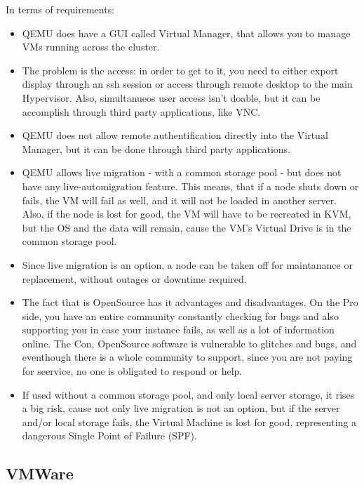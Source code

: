 In terms of requirements:

\begin{itemize}
  \item QEMU does have a GUI called Virtual Manager, that allows you to manage VMs running across the cluster.
  \item The problem is the access: in order to get to it, you need to either export display through an ssh session or access through remote desktop to the main Hypervisor. Also, simultanueos user access isn't doable, but it can be accomplish through third party applications, like VNC.
  \item QEMU does not allow remote authentification directly into the Virtual Manager, but it can be done through third party applications.
  \item QEMU allows live migration - with a common storage pool - but does not have any live-automigration feature. This means, that if a node shuts down or fails, the VM will fail as well, and it will not be loaded in another server. Also, if the node is lost for good, the VM will have to be recreated in KVM, but the OS and the data will remain, cause the VM's Virtual Drive is in the common storage pool.
  \item Since live migration is an option, a node can be taken off for maintanance or replacement, without outages or downtime required.
  \item The fact that is OpenSource has it advantages and disadvantages. On the Pro side, you have an entire community constantly checking for bugs and also supporting you in case your instance fails, as well as a lot of information online. The Con, OpenSource software is vulnerable to glitches and bugs, and eventhough there is a whole community to support, since you are not paying for seervice, no one is obligated to respond or help.
  \item If used without a common storage pool, and only local server storage, it rises a big risk, cause not only live migration is not an option, but if the server and/or local storage fails, the Virtual Machine is lost for good, representing a dangerous Single Point of Failure (SPF).
\end{itemize}

\newpage
\subsection{VMWare}

